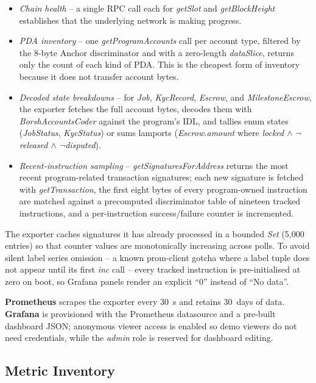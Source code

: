 \begin{itemize}[noitemsep]
    \item \emph{Chain health} -- a single RPC call each for \emph{getSlot} and \emph{getBlockHeight} establishes that the underlying network is making progress.
    \item \emph{PDA inventory} -- one \emph{getProgramAccounts} call per account type, filtered by the 8-byte Anchor discriminator and with a zero-length \emph{dataSlice}, returns only the count of each kind of PDA. This is the cheapest form of inventory because it does not transfer account bytes.
    \item \emph{Decoded state breakdowns} -- for \emph{Job}, \emph{KycRecord}, \emph{Escrow}, and \emph{MilestoneEscrow}, the exporter fetches the full account bytes, decodes them with \emph{BorshAccountsCoder} against the program's IDL, and tallies enum states (\emph{JobStatus}, \emph{KycStatus}) or sums lamports (\emph{Escrow.amount} where \emph{locked $\wedge$ $\lnot$released $\wedge$ $\lnot$disputed}).
    \item \emph{Recent-instruction sampling} -- \emph{getSignaturesForAddress} returns the most recent program-related transaction signatures; each new signature is fetched with \emph{getTransaction}, the first eight bytes of every program-owned instruction are matched against a precomputed discriminator table of nineteen tracked instructions, and a per-instruction success/failure counter is incremented.
\end{itemize}

The exporter caches signatures it has already processed in a bounded \emph{Set} (5{,}000 entries) so that counter values are monotonically increasing across polls. To avoid silent label series omission -- a known prom-client gotcha where a label tuple does not appear until its first \emph{inc} call -- every tracked instruction is pre-initialised at zero on boot, so Grafana panels render an explicit ``0'' instead of ``No data''.

\textbf{Prometheus} scrapes the exporter every 30~s and retains 30~days of data. \textbf{Grafana} is provisioned with the Prometheus datasource and a pre-built dashboard JSON; anonymous viewer access is enabled so demo viewers do not need credentials, while the \emph{admin} role is reserved for dashboard editing.

\subsection{Metric Inventory}
\label{subsection:4.7.3}

